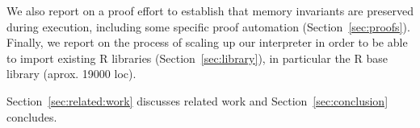 \documentclass[
    sigplan,
    10pt,
    review, %
    natbib=false %
 ]{acmart}
\newcommand\mb[1]{\todo[color=purple!20,size=\scriptsize]{#1}}
\newcommand\et[1]{\todo[color=blue!20,size=\scriptsize]{#1}}
\newcommand\eti[1]{\todo[color=blue!20,inline]{#1}}
\newcommand\CoqR{CoqR}
\begin{document}
We also report on a proof effort to establish that memory invariants are preserved during execution, including some specific proof automation (Section~\ref{sec:proofs}). 
Finally, we report on the process of scaling up our interpreter in order to be able to import existing R libraries (Section~\ref{sec:library}), in particular the R base library (aprox. 19000 loc).

Section~\ref{sec:related:work} discusses related work and Section~\ref{sec:conclusion} concludes.




%
%



\end{document}
